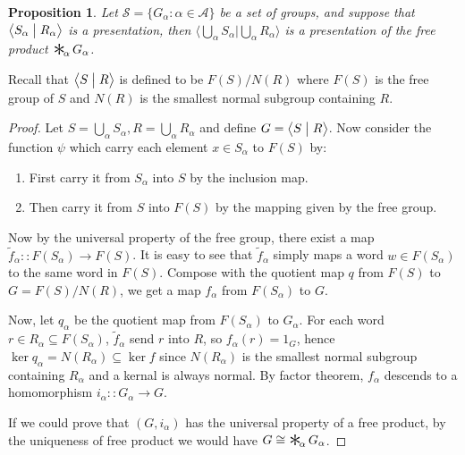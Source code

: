 \documentclass[a4paper,titlepage]{article}
\theoremstyle{remark}
\theoremstyle{definition}
\theoremstyle{definition}
\theoremstyle{plain}
\newtheorem{proposition}{Proposition}
\DeclareMathOperator*{\freeprod}{\raisebox{-0.4ex}{\scalebox{2}{$\ast$}}\!}
\begin{document}
  \begin{proposition}
    Let $\mathcal{S} = \{ G_\alpha : \alpha \in \mathcal{A} \}$ be a set of groups, and suppose that
    $\big\langle S_\alpha \bigm| R_\alpha \big\rangle$ is a presentation, then 
    $\Big\langle \bigcup\limits_\alpha S_\alpha \mathrel{\Big|} \bigcup\limits_\alpha R_\alpha \Big\rangle$
    is a presentation of the free product $\freeprod_\alpha G_\alpha$.
  \end{proposition}

  Recall that $\big\langle S \bigm| R \big\rangle$ is defined to be $F(S) / N(R)$ where $F(S)$ is
  the free group of $S$ and $N(R)$ is the smallest normal subgroup containing $R$.

  \begin{proof}
    Let $S = \bigcup_\alpha S_\alpha, R = \bigcup_\alpha R_\alpha$ and define 
    $G = \big\langle S \bigm| R \big\rangle$. Now consider the function $\psi$ which
    carry each element $x \in S_\alpha$ to $F(S)$ by:
    \begin{enumerate}
      \item First carry it from $S_\alpha$ into $S$ by the inclusion map.
      \item Then carry it from $S$ into $F(S)$ by the mapping given by the free group.
    \end{enumerate}
    Now by the universal property of the free group, there exist a map 
    $\tilde{f}_\alpha :: F(S_\alpha) \to F(S)$. It is easy to see that $\tilde{f}_\alpha$
    simply maps a word $w \in F(S_\alpha)$ to the same word in $F(S)$.
    Compose with the quotient map $q$ from $F(S)$ to $G = F(S) / N(R)$, we get a map $f_\alpha$ from
    $F(S_\alpha)$ to $G$. 

    Now, let $q_\alpha$ be the quotient map from $F(S_\alpha)$ to $G_\alpha$.
    For each word $r \in R_\alpha \subseteq F(S_\alpha)$, $\tilde{f}_\alpha$ send $r$ into $R$,
    so $f_\alpha(r) = 1_G$, hence $\ker q_\alpha = N(R_\alpha) \subseteq \ker f$ since $N(R_\alpha)$ is the smallest
    normal subgroup containing $R_\alpha$ and a kernal is always normal. By factor theorem, $f_\alpha$
    descends to a homomorphism $i_\alpha :: G_\alpha \to G$.

    If we could prove that $(G, i_\alpha)$ has the universal property of a free product, by the uniqueness
    of free product we would have $G \cong \freeprod_\alpha G_\alpha$.


\end{proof}
\end{document}
